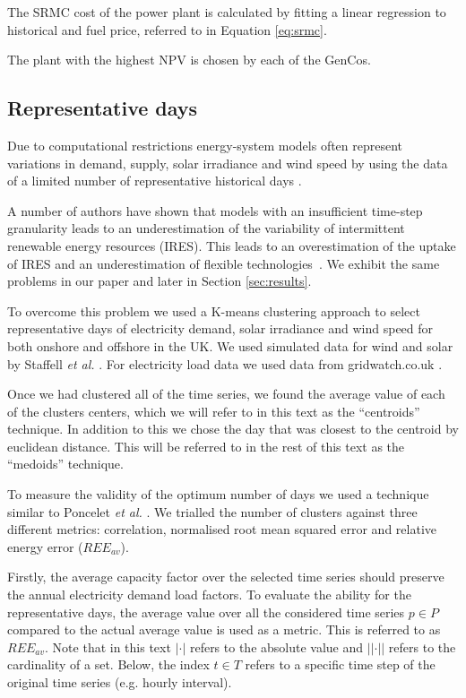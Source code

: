 \documentclass[final,3p,times,twocolumn,numbers]{elsarticle}
\begin{document}
The SRMC cost of the power plant is calculated by fitting a linear regression to historical  and fuel price, referred to in Equation \ref{eq:srmc}. 

The plant with the highest NPV is chosen by each of the GenCos.
 
 
\subsection{Representative days}
\label{ssec:representative_days}
Due to computational restrictions energy-system models often represent variations in demand, supply, solar irradiance and wind speed by using the data of a limited number of representative historical days \cite{Poncelet2017}.

A number of authors have shown that models with an insufficient time-step granularity leads to an underestimation of the variability of intermittent renewable energy resources (IRES). This leads to an overestimation of the uptake of IRES and an underestimation of flexible technologies~\cite{Ludig2011,Haydt2011}. We exhibit the same problems in our paper \cite{Kell} and later in Section \ref{sec:results}.

To overcome this problem we used a K-means clustering approach to select representative days of electricity demand, solar irradiance and wind speed for both onshore and offshore in the UK. We used simulated data for wind and solar by Staffell \textit{et al.} \cite{Staffell2016}. For electricity load data we used data from gridwatch.co.uk \cite{gridwatch}.

Once we had clustered all of the time series, we found the average value of each of the clusters centers, which we will refer to in this text as the ``centroids'' technique. In addition to this we chose the day that was closest to the centroid by euclidean distance. This will be referred to in the rest of this text as the ``medoids'' technique.

To measure the validity of the optimum number of days we used a technique similar to Poncelet \textit{et al.} \cite{Dhaeseleer2015, Poncelet2017}. We trialled the number of clusters against three different metrics: correlation, normalised root mean squared error and relative energy error ($REE_{av}$). 



Firstly, the average capacity factor over the selected time series should preserve the annual electricity demand load factors. To evaluate the ability for the representative days, the average value over all the considered time series $p\in P$ compared to the actual average value is used as a metric. This is referred to as $REE_{av}$. Note that in this text $\left|\cdot\right|$ refers to the absolute value and $\left|\left|\cdot\right|\right|$ refers to the cardinality of a set. Below, the index $t\in T$ refers to a specific time step of the original time series (e.g. hourly interval).
\end{document}
